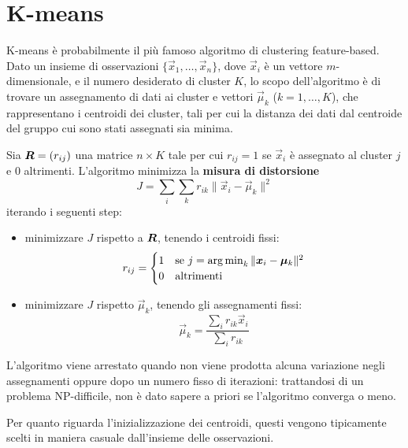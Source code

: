 \section{K-means}
\label{sec:k_means}

K-means è probabilmente il più famoso algoritmo di clustering feature-based. Dato un insieme di osservazioni $\{\vec{x}_1, \dots, \vec{x}_n\}$, dove $\vec{x}_i$ è un vettore $m$-dimensionale, e il numero desiderato di cluster $K$, lo scopo dell'algoritmo è di trovare un assegnamento di dati ai cluster e vettori $\vec{\mu}_k$ ($k = 1, \dots, K$), che rappresentano i centroidi dei cluster, tali per cui la distanza dei dati dal centroide del gruppo cui sono stati assegnati sia minima.

Sia $\mat{R} = (r_{ij})$ una matrice $n \times K$ tale per cui $r_{ij} = 1$ se $\vec{x}_i$ è assegnato al cluster $j$ e $0$ altrimenti. L'algoritmo minimizza la \textbf{misura di distorsione}
\begin{displaymath}
	J = \sum_i \sum_k r_{ik} \| \vec{x}_i - \vec{\mu}_k \|^2
\end{displaymath}
iterando i seguenti step:
\begin{itemize}
	\item minimizzare $J$ rispetto a $\mat{R}$, tenendo i centroidi fissi:
	\begin{displaymath}
		r_{ij} = \begin{cases}
 			1 & \text{se } j = \argmin_k \|\vec{x}_i - \vec{\mu}_k\|^2 \\
 			0 & \text{altrimenti}
 		\end{cases}
	\end{displaymath}
	\item minimizzare $J$ rispetto $\vec{\mu}_k$, tenendo gli assegnamenti fissi:
	\begin{displaymath}
		\vec{\mu}_k = \frac{\sum_i r_{ik} \vec{x}_i}{\sum_i r_{ik}}
	\end{displaymath}
\end{itemize}
L'algoritmo viene arrestato quando non viene prodotta alcuna variazione negli assegnamenti oppure dopo un numero fisso di iterazioni: trattandosi di un problema NP-difficile, non è dato sapere a priori se l'algoritmo converga o meno.

Per quanto riguarda l'inizializzazione dei centroidi, questi vengono tipicamente scelti in maniera casuale dall'insieme delle osservazioni.

